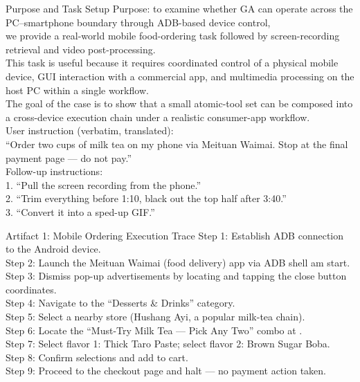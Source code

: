 \begin{CasePromptBox}{Purpose and Task Setup}
\small\ttfamily
Purpose: to examine whether GA can operate across the PC--smartphone boundary through ADB-based device control, \\
we provide a real-world mobile food-ordering task followed by screen-recording retrieval and video post-processing. \\
This task is useful because it requires coordinated control of a physical mobile device, GUI interaction with a commercial app, and multimedia processing on the host PC within a single workflow. \\
The goal of the case is to show that a small atomic-tool set can be composed into a cross-device execution chain under a realistic consumer-app workflow. \\[6pt]
User instruction (verbatim, translated): \\
``Order two cups of milk tea on my phone via Meituan Waimai. Stop at the final payment page --- do not pay.'' \\[4pt]
Follow-up instructions: \\
1. ``Pull the screen recording from the phone.'' \\
2. ``Trim everything before 1:10, black out the top half after 3:40.'' \\
3. ``Convert it into a sped-up GIF.''
\end{CasePromptBox}

\begin{CaseTraceBox}{Artifact 1: Mobile Ordering Execution Trace}
\small\ttfamily
Step 1: Establish ADB connection to the Android device. \\
Step 2: Launch the Meituan Waimai (food delivery) app via ADB shell am start. \\
Step 3: Dismiss pop-up advertisements by locating and tapping the close button coordinates. \\
Step 4: Navigate to the ``Desserts \& Drinks'' category. \\
Step 5: Select a nearby store (Hushang Ayi, a popular milk-tea chain). \\
Step 6: Locate the ``Must-Try Milk Tea --- Pick Any Two'' combo at . \\
Step 7: Select flavor 1: Thick Taro Paste; select flavor 2: Brown Sugar Boba. \\
Step 8: Confirm selections and add to cart. \\
Step 9: Proceed to the checkout page and halt --- no payment action taken.
\end{CaseTraceBox}

